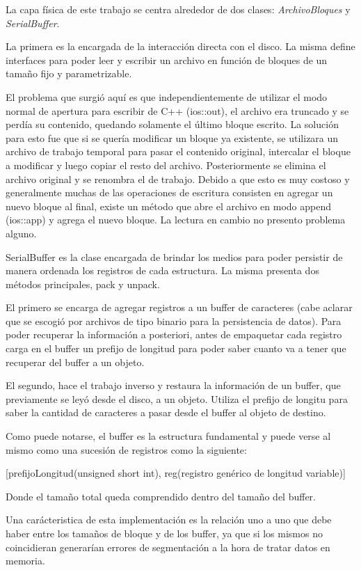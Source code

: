 \documentclass{article}
\begin{document}
	La capa física de este trabajo se centra alrededor de dos clases: \textit{ArchivoBloques} y \textit{SerialBuffer}.
	\par	
	La primera es la encargada de la interacción directa con el disco. La misma define interfaces para poder leer y escribir un archivo en función de bloques de un tamaño fijo y parametrizable.
	\par
	El problema que surgió aquí es que independientemente de utilizar el modo normal de apertura para escribir de C++ (ios::out), el archivo era truncado y se perdía su contenido, quedando solamente el último bloque escrito. La solución para esto fue que si se quería modificar un bloque ya existente, se utilizara un archivo de trabajo temporal para pasar el contenido original, intercalar el bloque a modificar y luego copiar el resto del archivo. Posteriormente se elimina el archivo original y se renombra el de trabajo. Debido a que esto es muy costoso y generalmente muchas de las operaciones de escritura consisten en agregar un nuevo bloque al final, existe un método que abre el archivo en modo append (ios::app) y agrega el nuevo bloque. La lectura en cambio no presento problema alguno.
	\par
	SerialBuffer es la clase encargada de brindar los medios para poder persistir de manera ordenada los registros de cada estructura. La misma presenta dos métodos principales, pack y unpack.
	\par
	El primero se encarga de agregar registros a un buffer de caracteres (cabe aclarar que se escogió por archivos de tipo binario para la persistencia de datos). Para poder recuperar la información a posteriori, antes de empaquetar cada registro carga en el buffer un prefijo de longitud para poder saber cuanto va a tener que recuperar del buffer a un objeto.
	\par
	El segundo, hace el trabajo inverso y restaura la información de un buffer, que previamente se leyó desde el disco, a un objeto. Utiliza el prefijo de longitu para saber la cantidad de caracteres a pasar desde el buffer al objeto de destino.
	\par
	Como puede notarse, el buffer es la estructura fundamental y puede verse al mismo como una sucesión de registros como la siguiente:
	\bigskip


	{\ttfamily\footnotesize
	[prefijoLongitud(unsigned short int), reg(registro genérico de longitud variable)] \\}
	\medskip


	Donde el tamaño total queda comprendido dentro del tamaño del buffer.
	\par
	Una carácteristica de esta implementación es la relación uno a uno que debe haber entre los tamaños de bloque y de los buffer, ya que si los mismos no coincidieran generarían errores de segmentación a la hora de tratar datos en memoria.	
	\bigskip\medskip
\end{document}
